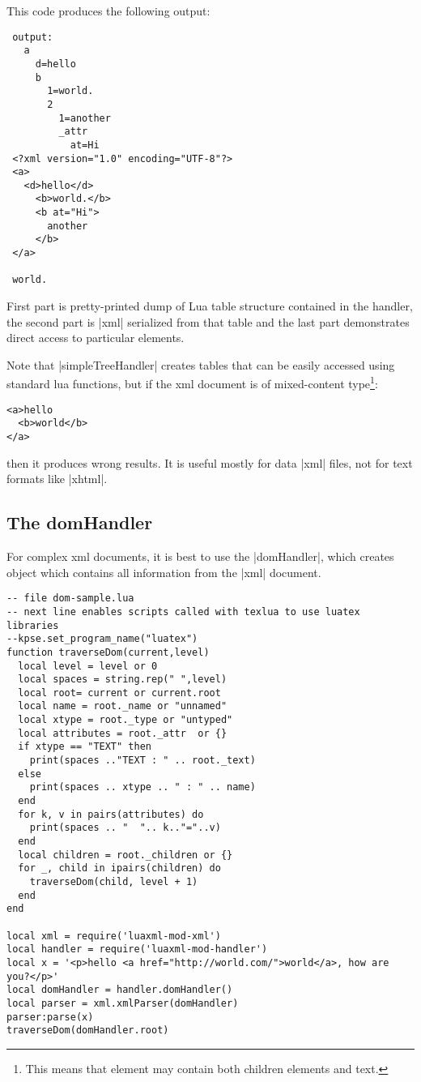 \documentclass{ltxdoc}
\begin{document}
This code produces the following output:

\begin{verbatim}
 output:
   a
     d=hello
     b
       1=world.
       2
         1=another
         _attr
           at=Hi
 <?xml version="1.0" encoding="UTF-8"?>
 <a>
   <d>hello</d>
     <b>world.</b>
     <b at="Hi">
       another
     </b>
 </a>
 
 world.
\end{verbatim}

First part is pretty-printed dump of Lua table structure contained in the handler, the second
part is |xml| serialized from that table and the last part demonstrates direct access to particular
elements.

Note that |simpleTreeHandler| creates tables that can be easily accessed using
standard lua functions, but if the xml document is of mixed-content type\footnote{%
This means that element may contain both children elements and text.}:

\begin{verbatim}
<a>hello
  <b>world</b>
</a>	  
\end{verbatim}

\noindent then it produces wrong results. It is useful mostly for data |xml| files, not for
text formats like |xhtml|.

\subsection{The domHandler}

For complex xml documents, it is best to use the |domHandler|, which creates object which contains all information
from the |xml| document. 

\begin{verbatim}
-- file dom-sample.lua
-- next line enables scripts called with texlua to use luatex libraries
--kpse.set_program_name("luatex")
function traverseDom(current,level)
  local level = level or 0
  local spaces = string.rep(" ",level)
  local root= current or current.root
  local name = root._name or "unnamed"
  local xtype = root._type or "untyped"
  local attributes = root._attr  or {} 
  if xtype == "TEXT" then 
    print(spaces .."TEXT : " .. root._text)
  else	 
    print(spaces .. xtype .. " : " .. name) 
  end
  for k, v in pairs(attributes) do
    print(spaces .. "  ".. k.."="..v)
  end
  local children = root._children or {}
  for _, child in ipairs(children) do
    traverseDom(child, level + 1)
  end
end

local xml = require('luaxml-mod-xml')
local handler = require('luaxml-mod-handler')
local x = '<p>hello <a href="http://world.com/">world</a>, how are you?</p>'
local domHandler = handler.domHandler()
local parser = xml.xmlParser(domHandler)
parser:parse(x)
traverseDom(domHandler.root)
\end{verbatim}
\end{document}
